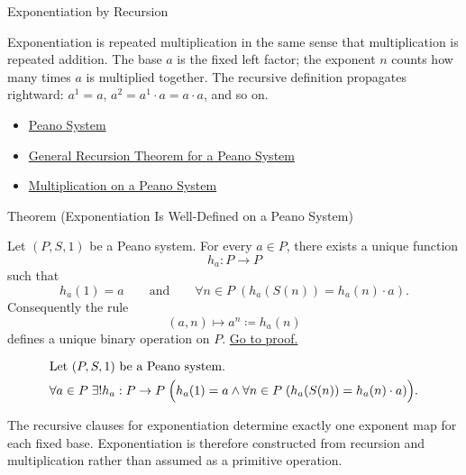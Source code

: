 \begin{topicbox}{Exponentiation by Recursion}
\begin{remark*}[Interpretation]
Exponentiation is repeated multiplication in the same sense that multiplication
is repeated addition. The base $a$ is the fixed left factor; the exponent $n$
counts how many times $a$ is multiplied together. The recursive definition
propagates rightward: $a^1 = a$, $a^2 = a^1 \cdot a = a \cdot a$, and so on.
\end{remark*}

\begin{dependencies}
\begin{itemize}
  \item \hyperref[def:peano-system]{Peano System}
  \item \hyperref[thm:general-recursion-theorem-for-peano-system]{General Recursion Theorem for a Peano System}
  \item \hyperref[def:multiplication-on-peano-system]{Multiplication on a Peano System}
\end{itemize}
\end{dependencies}

\begin{theorembox}{Theorem (Exponentiation Is Well-Defined on a Peano System)}
\begin{theorem}
\label{thm:exponentiation-well-defined-on-peano-system}
Let $(P,S,1)$ be a Peano system. For every $a \in P$, there exists a unique
function
\[
h_a:P\to P
\]
such that
\[
h_a(1)=a
\qquad\text{and}\qquad
\forall n \in P\;(h_a(S(n))=h_a(n)\cdot a).
\]
Consequently the rule
\[
(a,n)\longmapsto a^n\coloneqq h_a(n)
\]
defines a unique binary operation on $P$.
\hyperref[prf:exponentiation-well-defined-on-peano-system]{Go to proof.}
\end{theorem}
\end{theorembox}

\begin{remark*}
\[
\begin{aligned}
&\text{Let } (P,S,1) \text{ be a Peano system.}\\
&\forall a \in P\;\exists! h_a:P\to P\;
\Bigl(h_a(1)=a \land
\forall n \in P\;(h_a(S(n))=h_a(n)\cdot a)\Bigr).
\end{aligned}
\]
\end{remark*}

\begin{remark*}[Interpretation]
The recursive clauses for exponentiation determine exactly one exponent map
for each fixed base. Exponentiation is therefore constructed from recursion
and multiplication rather than assumed as a primitive operation.
\end{remark*}


\end{topicbox}
